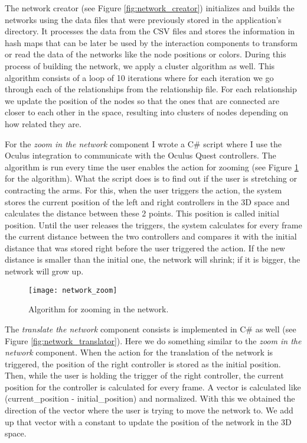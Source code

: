The network creator (see Figure \ref{fig:network_creator}) initializes and builds the networks using the data files that were previously stored in the application's directory. It processes the data from the CSV files and stores the information in hash maps that can be later be used by the interaction components to transform or read the data of the networks like the node positions or colors. During this process of building the network, we apply a cluster algorithm as well. This algorithm consists of a loop of 10 iterations where for each iteration we go through each of the relationships from the relationship file. For each relationship we update the position of the nodes so that the ones that are connected are closer to each other in the space, resulting into clusters of nodes depending on how related they are.

For the \textit{zoom in the network} component I wrote a C\# script where I use the Oculus integration to communicate with the Oculus Quest controllers. The algorithm is run every time the user enables the action for zooming (see Figure \ref{fig:network_zoom} for the algorithm). What the script does is to find out if the user is stretching or contracting the arms. For this, when the user triggers the action, the system stores the current position of the left and right controllers in the 3D space and calculates the distance between these 2 points. This position is called initial position. Until the user releases the triggers, the system calculates for every frame the current distance between the two controllers and compares it with the initial distance that was stored right before the user triggered the action. If the new distance is smaller than the initial one, the network will shrink; if it is bigger, the network will grow up.

\begin{figure}[h!]
    \centering%
    \texttt{[image: network\_zoom]}
    \caption{Algorithm for zooming in the network.}
    \label{fig:network_zoom}
\end{figure}%

The \textit{translate the network} component consists is implemented in C\# as well (see Figure \ref{fig:network_translator}). Here we do something similar to the \textit{zoom in the network} component. When the action for the translation of the network is triggered, the position of the right controller is stored as the initial position. Then, while the user is holding the trigger of the right controller, the current position for the controller is calculated for every frame. A vector is calculated like (current\_position - initial\_position) and normalized. With this we obtained the direction of the vector where the user is trying to move the network to. We add up that vector with a constant to update the position of the network in the 3D space.

